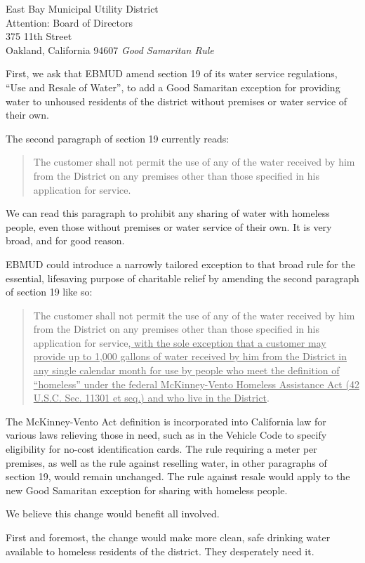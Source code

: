 \documentclass[letterpaper]{letter}
\begin{document}
\begin{letter}{%
    East Bay Municipal Utility District\\
    Attention: Board of Directors\\
    375 11th Street\\
    Oakland, California 94607}
    \stopbreaks
    \emph{Good Samaritan Rule}

    First, we ask that EBMUD amend section 19 of its water service regulations, “Use and Resale of Water”, to add a Good Samaritan exception for providing water to unhoused residents of the district without premises or water service of their own.
    \startbreaks

    The second paragraph of section 19 currently reads:

    \begin{quote}
    The customer shall not permit the use of any of the water received by him from the District on any premises other than those specified in his application for service.
    \end{quote}

    We can read this paragraph to prohibit any sharing of water with homeless people, even those without premises or water service of their own. It is very broad, and for good reason.

    EBMUD could introduce a narrowly tailored exception to that broad rule for the essential, lifesaving purpose of charitable relief by amending the second paragraph of section 19 like so:

    \begin{quote}
      The customer shall not permit the use of any of the water received by him from the District on any premises other than those specified in his application for service\ul{, with the sole exception that a customer may provide up to 1,000 gallons of water received by him from the District in any single calendar month for use by people who meet the definition of “homeless” under the federal McKinney-Vento Homeless Assistance Act (42 U.S.C. Sec. 11301 et seq.) and who live in the District}.
    \end{quote}

    The McKinney-Vento Act definition is incorporated into California law for various laws relieving those in need, such as in the Vehicle Code to specify eligibility for no-cost identification cards. The rule requiring a meter per premises, as well as the rule against reselling water, in other paragraphs of section 19, would remain unchanged. The rule against resale would apply to the new Good Samaritan exception for sharing with homeless people.

    We believe this change would benefit all involved.

    First and foremost, the change would make more clean, safe drinking water available to homeless residents of the district. They desperately need it.


\end{letter}
\end{document}
